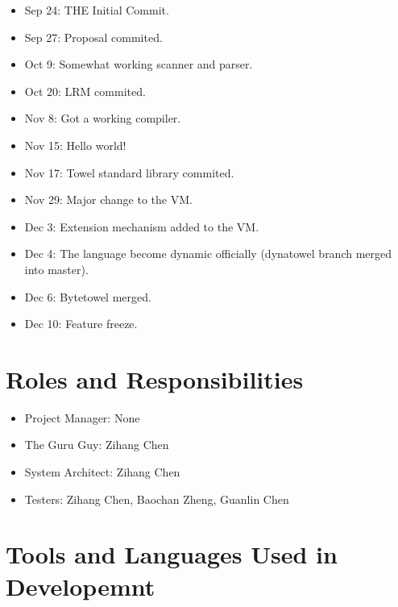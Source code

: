 \documentclass{report}
\begin{document}
\begin{itemize}
\item Sep 24: THE Initial Commit.
\item Sep 27: Proposal commited.
\item Oct 9: Somewhat working scanner and parser.
\item Oct 20: LRM commited.
\item Nov 8: Got a working compiler.
\item Nov 15: Hello world!
\item Nov 17: Towel standard library commited.
\item Nov 29: Major change to the VM.
\item Dec 3: Extension mechanism added to the VM.
\item Dec 4: The language become dynamic officially (dynatowel branch merged into master).
\item Dec 6: Bytetowel merged.
\item Dec 10: Feature freeze.
\end{itemize}

\section{Roles and Responsibilities}

\begin{itemize}
\item Project Manager: None
\item The Guru Guy: Zihang Chen
\item System Architect: Zihang Chen
\item Testers: Zihang Chen, Baochan Zheng, Guanlin Chen
\end{itemize}

\section{Tools and Languages Used in Developemnt}
\end{document}

